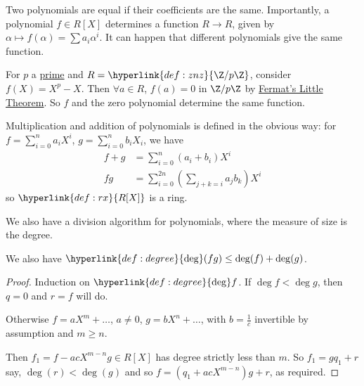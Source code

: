\documentclass{article}
\begin{document}
Two polynomials are equal if their coefficients are the same.
Importantly, a polynomial $f \in R[X]$ determines a function $R \to R$, given by $\alpha \mapsto f(\alpha) = \sum a_i \alpha^i$.
It can happen that different polynomials give the same function.

\begin{eg}
    For $p$ a \hyperlink{def:prime}{prime} and $R = \hyperlink{def:znz}{\Z/p\Z}$, consider $f(X) = X^p - X$.
    Then $\forall a \in R$, $f(a) = 0$ in $\Z/p\Z$ by \hyperlink{thm:fermatLittle}{Fermat's Little Theorem}.
    So $f$ and the zero polynomial determine the same function.
\end{eg}

Multiplication and addition of polynomials is defined in the obvious way: for $f = \sum_{i=0}^n a_i X^i$, $g = \sum_{i=0}^n b_i X_i$, we have
\begin{align*}
    f + g &= \sum_{i=0}^n (a_i + b_i) X^i \\
    fg &= \sum_{i=0}^{2n} \left(\sum_{j+k=i} a_j b_k\right) X^i
\end{align*}
so $\hyperlink{def:rx}{R[X]}$ is a ring.

We also have a division algorithm for polynomials, where the measure of size is the degree.


We also have $\hyperlink{def:degree}{\deg}(fg) \leq \deg(f) + \deg(g)$.


\begin{proof}
    Induction on $\hyperlink{def:degree}{\deg} f$.
    If $\deg f < \deg g$, then $q = 0$ and $r = f$ will do.

    Otherwise $f = a X^m + \dots$, $a \neq 0$, $g = b X^n + \dots$, with $b = \frac{1}{c}$ invertible by assumption and $m \geq n$.

    Then $f_1 = f - ac X^{m-n} g \in R[X]$ has degree strictly less than $m$.
    So $f_1 = g q_1 + r$ say, $\deg(r) < \deg(g)$ and so $f = (q_1 + ac X^{m-n}) g + r$, as required.
\end{proof}
\end{document}
